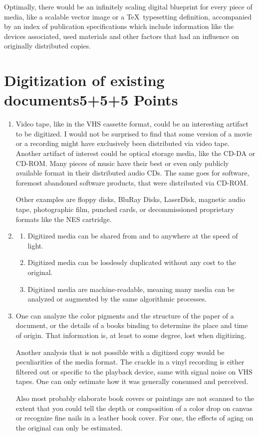 \documentclass[10pt,a4paper]{article}
\begin{document}
\begin{enumerate}
    Optimally, there would be an infinitely scaling digital blueprint for every piece of media, like a scalable vector image or a \TeX\ typesetting definition, accompanied by an index of publication specifications which include information like the devices associated, used materials and other factors that had an influence on originally distributed copies.
\end{enumerate}



\section{\hfill Digitization of existing documents\hfill 5+5+5 Points}
\begin{enumerate}
    \item Video tape, like in the VHS cassette format, could be an interesting artifact to be digitized. I would not be surprised to find that some version of a movie or a recording might have exclusively been distributed via video tape.\\
    Another artifact of interest could be optical storage media, like the CD-DA or CD-ROM. Many pieces of music have their best or even only publicly available format in their distributed audio CDs. The same goes for software, foremost abandoned software products, that were distributed via CD-ROM.
    
    Other examples are floppy disks, BluRay Disks, LaserDisk, magnetic audio tape, photographic film, punched cards, or decommissioned proprietary formats like the NES cartridge.
    
    \item \begin{enumerate}
        \item Digitized media can be shared from and to anywhere at the speed of light.
        \item Digitized media can be losslessly duplicated without any cost to the original.
        \item Digitized media are machine-readable, meaning many media can be analyzed or augmented by the same algorithmic processes.
    \end{enumerate}
    
    \item One can analyze the color pigments and the structure of the paper of a document, or the details of a books binding to determine its place and time of origin. That information is, at least to some degree, lost when digitizing.
    
    Another analysis that is not possible with a digitized copy would be peculiarities of the media format. The crackle in a vinyl recording is either filtered out or specific to the playback device, same with signal noise on VHS tapes. One can only estimate how it was generally consumed and perceived.
    
    Also most probably elaborate book covers or paintings are not scanned to the extent that you could tell the depth or composition of a color drop on canvas or recognize fine nails in a leather book cover. For one, the effects of aging on the original can only be estimated.
\end{enumerate}
\end{document}
